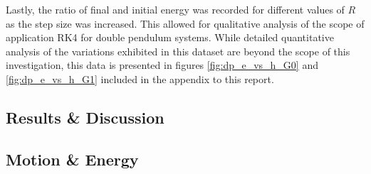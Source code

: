 \documentclass[11pt]{article}
\begin{document}
Lastly, the ratio of final and initial energy was recorded for different values of $R$ as the step size was increased. This allowed for qualitative analysis of the scope of application RK4 for double pendulum systems. While detailed quantitative analysis of the variations exhibited in this dataset are beyond the scope of this investigation, this data is presented in figures \ref{fig:dp_e_vs_h_G0} and \ref{fig:dp_e_vs_h_G1} included in the appendix to this report. %


\subsection{Results \& Discussion}
\subsection*{Motion \& Energy}
\end{document}

